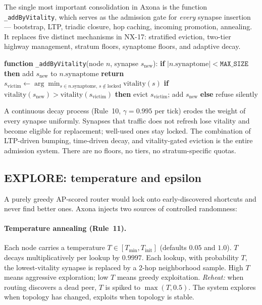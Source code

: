 \documentclass[conference]{IEEEtran}
\newcommand{\axona}{Axona\xspace}
\newcommand{\NXseventeen}{NX-17\xspace}
\begin{document}
The single most important consolidation in \axona is the function
\texttt{\_addByVitality}, which serves as the admission gate for
\emph{every} synapse insertion --- bootstrap, LTP, triadic closure,
hop caching, incoming promotion, annealing. It replaces five distinct
mechanisms in \NXseventeen: stratified eviction, two-tier highway
management, stratum floors, synaptome floors, and adaptive decay.

\begin{algorithmic}
\STATE \textbf{function} \texttt{\_addByVitality}(node $n$, synapse $s_{\mathrm{new}}$):
\STATE \quad \textbf{if} $|n.\mathrm{synaptome}| < \texttt{MAX\_SIZE}$ \textbf{then}
\STATE \quad \quad add $s_{\mathrm{new}}$ to $n.\mathrm{synaptome}$
\STATE \quad \quad \textbf{return}
\STATE \quad $s_{\mathrm{victim}} \leftarrow \arg\min_{s \in n.\mathrm{synaptome},\, s \notin \mathrm{locked}} \mathrm{vitality}(s)$
\STATE \quad \textbf{if} $\mathrm{vitality}(s_{\mathrm{new}}) > \mathrm{vitality}(s_{\mathrm{victim}})$ \textbf{then}
\STATE \quad \quad evict $s_{\mathrm{victim}}$; add $s_{\mathrm{new}}$
\STATE \quad \textbf{else}
\STATE \quad \quad refuse silently
\end{algorithmic}

\noindent
A continuous decay process (Rule~10, $\gamma = 0.995$ per tick) erodes the
weight of every synapse uniformly. Synapses that traffic does not refresh
lose vitality and become eligible for replacement; well-used ones stay
locked. The combination of LTP-driven bumping, time-driven decay, and
vitality-gated eviction is the entire admission system. There are no
floors, no tiers, no stratum-specific quotas.

\subsection{EXPLORE: temperature and epsilon}
\label{sec:nh1-explore}

A purely greedy AP-scored router would lock onto early-discovered
shortcuts and never find better ones. \axona injects two sources of
controlled randomness:

\paragraph{Temperature annealing (Rule~11).}
Each node carries a temperature $T \in [T_{\min}, T_{\mathrm{init}}]$
(defaults $0.05$ and $1.0$). $T$ decays multiplicatively per lookup by
$0.9997$. Each lookup, with probability $T$, the lowest-vitality
synapse is replaced by a 2-hop neighborhood sample. High $T$ means
aggressive exploration; low $T$ means greedy exploitation. \emph{Reheat:}
when routing discovers a dead peer, $T$ is spiked to
$\max(T, 0.5)$. The system explores when topology has changed, exploits
when topology is stable.
\end{document}
